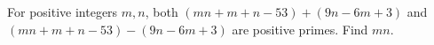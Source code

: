 For positive integers $m,n$, both $(mn+m+n-53)+(9n-6m+3)$ and $(mn+m+n-53)-(9n-6m+3)$ are positive primes. Find $mn$.
